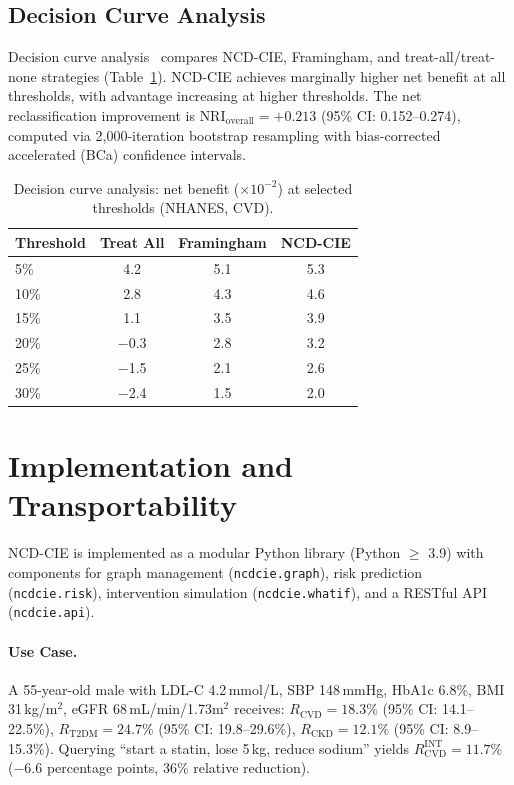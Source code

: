 \documentclass[runningheads]{llncs}
\begin{document}
\subsection{Decision Curve Analysis}\label{sec:dca}

Decision curve analysis~\cite{vickers2006dca} compares NCD-CIE,
Framingham, and treat-all/treat-none strategies
(Table~\ref{tab:dca}).  NCD-CIE achieves marginally higher net benefit
at all thresholds, with advantage increasing at higher thresholds.
The net reclassification improvement is $\text{NRI}_{\text{overall}} =
+0.213$ (95\% CI: 0.152--0.274), computed via 2{,}000-iteration
bootstrap resampling with bias-corrected accelerated (BCa) confidence
intervals.

\begin{table}[t]
\centering
\caption{Decision curve analysis: net benefit ($\times 10^{-2}$) at
selected thresholds (NHANES, CVD).}
\label{tab:dca}
\small
\begin{tabular}{@{}lccc@{}}
\toprule
\textbf{Threshold} & \textbf{Treat All} & \textbf{Framingham} &
\textbf{NCD-CIE} \\
\midrule
5\%  & 4.2 & 5.1 & 5.3 \\
10\% & 2.8 & 4.3 & 4.6 \\
15\% & 1.1 & 3.5 & 3.9 \\
20\% & $-$0.3 & 2.8 & 3.2 \\
25\% & $-$1.5 & 2.1 & 2.6 \\
30\% & $-$2.4 & 1.5 & 2.0 \\
\bottomrule
\end{tabular}
\end{table}

\section{Implementation and Transportability}\label{sec:impl}

NCD-CIE is implemented as a modular Python library (Python $\geq$
3.9) with components for graph management (\texttt{ncdcie.graph}),
risk prediction (\texttt{ncdcie.risk}), intervention simulation
(\texttt{ncdcie.whatif}), and a RESTful API (\texttt{ncdcie.api}).

\paragraph{Use Case.}
A 55-year-old male with LDL-C 4.2\,mmol/L, SBP 148\,mmHg, HbA1c
6.8\%, BMI 31\,kg/m$^2$, eGFR 68\,mL/min/1.73m$^2$ receives:
$R_{\text{CVD}} = 18.3\%$ (95\% CI: 14.1--22.5\%),
$R_{\text{T2DM}} = 24.7\%$ (95\% CI: 19.8--29.6\%),
$R_{\text{CKD}} = 12.1\%$ (95\% CI: 8.9--15.3\%).
Querying ``start a statin, lose 5\,kg, reduce sodium'' yields
$R_{\text{CVD}}^{\text{INT}} = 11.7\%$ ($-$6.6 percentage points,
36\% relative reduction).
\end{document}
